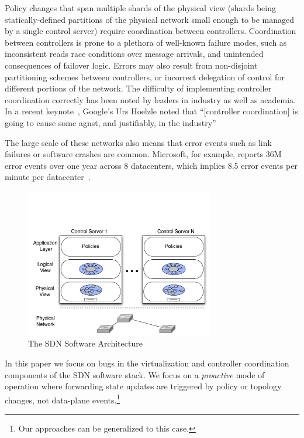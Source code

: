 Policy changes that span multiple shards of the physical view (shards being
statically-defined partitions of the physical network small enough to be managed
by a single control server) require coordination between controllers.
Coordination between controllers is prone to a plethora of well-known failure
modes, such as inconsistent reads race conditions over message arrivals, and
unintended consequences of failover logic. Errors may also result from
non-disjoint partitioning schemes between controllers, or incorrect delegation
of control for different portions of the network. The difficulty of implementing
controller coordination correctly has been noted by leaders in industry as well
as academia. In a recent keynote~\cite{urs_keynote}, Google's Urs
H$\ddot{\mathrm{o}}$elzle noted that ``[controller coordination] is going to
cause some agnst, and justifiably, in the industry''

The large scale of these networks also means that
error events such as link failures or software crashes are common. Microsoft,
for example, reports 36M error events over one year across 8 datacenters, which
implies 8.5 error events per minute per
datacenter~\cite{Greenberg:2009:VSF:1592568.1592576}. 


\begin{figure}[t]
    \includegraphics[width=3.25in]{../diagrams/architecture/SDN_Stack.pdf}
    \caption[]{\label{fig:basicarch} The SDN Software Architecture }
\end{figure}

In this paper we focus on bugs in the virtualization and controller coordination
components of the SDN software stack. We focus on a \emph{proactive} mode of
operation where forwarding state updates are triggered by policy or topology
changes, not data-plane events.\footnote{Our approaches can be generalized to
this case.} 
